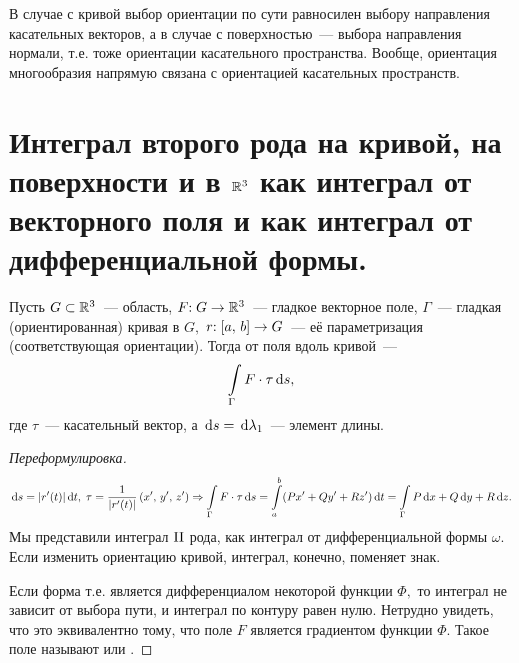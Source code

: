 \documentclass{notes}
\newcommand{\II}{\mr{II}}
\begin{document}
	\begin{rem}
		В случае с кривой выбор ориентации по сути равносилен выбору направления касательных векторов, а в случае с поверхностью~--- выбора направления нормали, т.е. тоже ориентации касательного пространства. Вообще, ориентация многообразия напрямую связана с ориентацией касательных пространств.
	\end{rem}

\section{Интеграл второго рода на кривой, на поверхности и в $\mathbb{R}^3$ как интеграл от векторного поля и как интеграл от дифференциальной формы.}

	\begin{de}
		Пусть $G \subset \mathbb{R}^3$~--- область, $F \text{\text{:}} \; G \to \mathbb{R}^3$~--- гладкое векторное поле, $\Gamma$~--- гладкая (ориентированная) кривая в $G,$ $r\text{\text{:}}\; [a, \, b] \to G$~--- её параметризация (соответствующая ориентации). Тогда \ti{интеграл $\II$ рода} от поля вдоль кривой~---
		\[
			\int\limits_{\Gamma} F\cdot \tau \, \mathrm{d} s,
		\]
		где $\tau$~--- касательный вектор, а $\, \mathrm{d} s = \, \mathrm{d} \lambda_1$~--- элемент длины.
		\begin{proof}[Переформулировка]
			\[
				\, \mathrm{d} s = |r'(t)| \, \mathrm{d} t, \; \tau = \dfrac{1}{|r'(t)|} \left(x', \, y', \, z'\right) \Rightarrow \int\limits_{\Gamma} F\cdot \tau \, \mathrm{d} s = \int\limits_a^b (Px' + Qy' + Rz') \, \mathrm{d} t = \int\limits_{\Gamma} P \, \mathrm{d} x + Q \, \mathrm{d} y + R \, \mathrm{d} z.
			\]
			Мы представили интеграл $\II$ рода, как интеграл от дифференциальной формы $\omega$. Если изменить ориентацию кривой, интеграл, конечно, поменяет знак. 

			Если форма  т.е. является дифференциалом некоторой функции $\Phi,$ то интеграл не зависит от выбора пути, и интеграл по контуру равен нулю. Нетрудно увидеть, что это эквивалентно тому, что поле $F$ является градиентом функции $\Phi$. Такое поле называют  или .
		\end{proof}
	\end{de}
\end{document}
